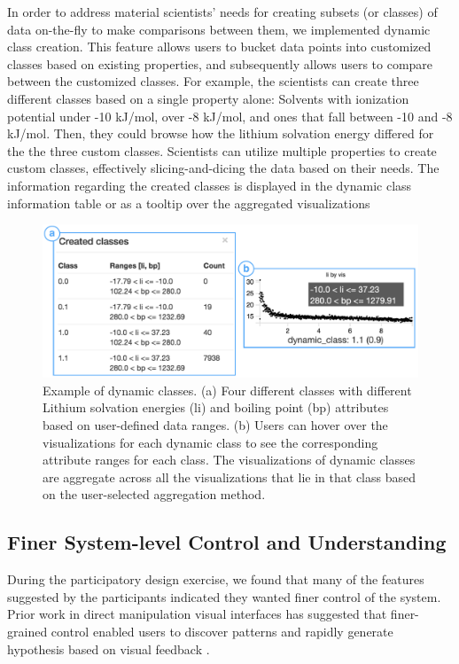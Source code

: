  In order to address material scientists' needs for creating subsets (or classes) of data on-the-fly to make comparisons between them, we implemented dynamic class creation. This feature allows users to bucket data points into customized classes based on existing properties, and subsequently allows users to compare between the customized classes. For example, the scientists can create three different classes based on a single property alone: Solvents with ionization potential under -10 kJ/mol, over -8 kJ/mol, and ones that fall between -10 and -8 kJ/mol. Then, they could browse how the lithium solvation energy differed for the the three custom classes. 
\npar Scientists can utilize multiple properties to create custom classes, effectively slicing-and-dicing the data based on their needs. The information regarding the created classes is displayed in the dynamic class information table or as a tooltip over the aggregated visualizations
\begin{figure}[h!]
\centering
\includegraphics[width=\linewidth]{figures/dcc_example.pdf}
\vspace{-6pt}
\caption{Example of dynamic classes. (a) Four different classes with different Lithium solvation energies (li) and boiling point (bp) attributes based on user-defined data ranges. (b) Users can hover over the visualizations for each dynamic class to see the corresponding attribute ranges for each class. The visualizations of dynamic classes are aggregate across all the visualizations that lie in that class based on the user-selected aggregation method.}
\label{dcc}
\vspace{-10pt}
\end{figure}
\subsection{Finer System-level Control and  Understanding}
\par During the participatory design exercise, we found that many of the features suggested by the participants indicated they wanted finer control of the system. Prior work in direct manipulation visual interfaces has suggested that finer-grained control enabled users to discover patterns and rapidly generate hypothesis based on visual feedback \cite{Shneiderman1994,Shneiderman2007a}. 

